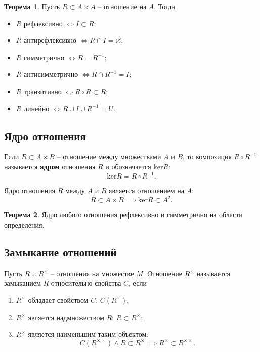 \documentclass[a5paper, 11pt]{extarticle}
\theoremstyle{definition}
\newtheorem*{theorem*}{Теорема}
\theoremstyle{definition}
\theoremstyle{definition}
\numberwithin{figure}{section}
\numberwithin{table}{section}
\begin{document}
\begin{theorem*}
    Пусть \(R \subset A \times A\) -- отношение на \(A\). Тогда
    \begin{itemize}
        \item \(R \text{ рефлексивно } \iff I \subset R\);
        \item \(R \text{ антирефлексивно } \iff R \cap I = \varnothing\);
        \item \(R \text{ симметрично } \iff R = R^{-1}\);
        \item \(R \text{ антисимметрично } \iff R \cap R^{-1} = I\);
        \item \(R \text{ транзитивно } \iff R \circ R \subset R\);
        \item \(R \text{ линейно } \iff R \cup I \cup R^{-1} = U\).
    \end{itemize}
\end{theorem*}

\subsection{Ядро отношения}

Если \(R \subset A \times B\) -- отношение между множествами \(A\) и \(B\), то композиция \(R \circ R^{-1}\) называется \textbf{ядром} отношения \(R\) и обозначается \(\text{ker} R\):
\[
    \text{ker} R = R \circ R^{-1}.
\]

Ядро отношения \(R\) между \(A\) и \(B\) является отношением на \(A\):
\[
    R \subset A \times B \implies \text{ker} R \subset A^2.
\]

\begin{theorem*}
    Ядро любого отношения рефлексивно и симметрично на области определения.
\end{theorem*}

\subsection{Замыкание отношений}

Пусть \(R\) и \(R^\times\) -- отношения на множестве \(M\). Отношение \(R^\times\) называется замыканием \(R\) относительно свойства \(C\), если
\begin{enumerate}
    \item \(R^\times\) обладает свойством \(C\): \(C(R^\times)\);
    \item \(R^\times\) является надмножеством \(R\): \(R \subset R^\times\);
    \item \(R^\times\) является наименьшим таким объектом:
          \[
              C(R^{\times \times}) \land R \subset R^\times \implies R^\times \subset R^{\times \times}.
          \]
\end{enumerate}
\end{document}
